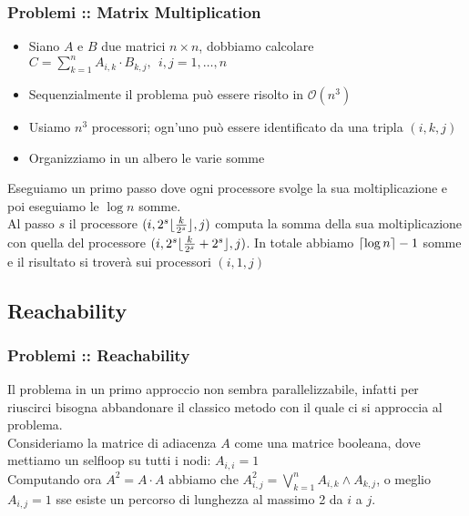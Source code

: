 \documentclass{beamer}
\newcommand{\bigO}{\ensuremath{\mathcal{O}}} %
\DeclarePairedDelimiter{\ceil}{\lceil}{\rceil} %
\DeclarePairedDelimiter{\floor}{\lfloor}{\rfloor} %
\begin{document}
\begin{frame}
\frametitle{Problemi :: Matrix Multiplication} %
\begin{itemize}
	\item Siano $A$ e $B$ due matrici $n \times n$, dobbiamo calcolare $C = \sum_{k=1}^{n}A_{i,k}\cdot B_{k,j},\ \ i,j=1,\dots,n$
	\item Sequenzialmente il problema può essere risolto in $\bigO{(n^3)}$
	\item Usiamo $n^3$ processori; ogn'uno può essere identificato da una tripla $(i,k,j)$
	\item Organizziamo in un albero le varie somme
\end{itemize}
Eseguiamo un primo passo dove ogni processore svolge la sua moltiplicazione e poi eseguiamo le $\log n$ somme.\\
Al passo $s$ il processore $(i,2^s \floor{ \frac{k}{2^s} },j)$ computa la somma della sua moltiplicazione con quella del processore $(i,2^s \floor{ \frac{k}{2^s} + 2^s},j)$.
In totale abbiamo $\ceil{\log n} - 1$ somme e il risultato si troverà sui processori $(i,1,j)$

\end{frame}

\subsection{Reachability}

\begin{frame}
	\frametitle{Problemi :: Reachability} %
	Il problema in un primo approccio non sembra parallelizzabile, infatti per riuscirci bisogna abbandonare il classico metodo con il quale ci si approccia al problema.\\
	Consideriamo la matrice di adiacenza $A$ come una matrice booleana, dove mettiamo un selfloop su tutti i nodi: $A_{i,i} = 1$\\
	Computando ora $A^2 = A\cdot A$ abbiamo che $A_{i,j}^2 = \bigvee_{k=1}^n A_{i,k} \wedge A_{k,j}$, o meglio $A_{i,j} = 1 $ sse esiste un percorso di lunghezza al massimo 2 da $i$ a $j$.\\
		
\end{frame}
\end{document}
